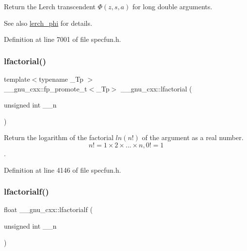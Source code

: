 Return the Lerch transcendent $ \Phi(z,s,a) $ for {\ttfamily  long double } arguments.

\begin{DoxySeeAlso}{See also}
\hyperlink{group__gnu__math__spec__func_ga31d7cfc601a99d72e58f654d0c890fd6}{lerch\+\_\+phi} for details. 
\end{DoxySeeAlso}


Definition at line 7001 of file specfun.\+h.

\mbox{\label{group__gnu__math__spec__func_gab256f8d7b77b9a8fefafca21827166eb}} 
\subsubsection{\texorpdfstring{lfactorial()}{lfactorial()}}
{\footnotesize\ttfamily template$<$typename \+\_\+\+Tp $>$ \\
\+\_\+\+\_\+gnu\+\_\+cxx\+::fp\+\_\+promote\+\_\+t$<$\+\_\+\+Tp$>$ \+\_\+\+\_\+gnu\+\_\+cxx\+::lfactorial (\begin{DoxyParamCaption}\item[{unsigned int}]{\+\_\+\+\_\+n }\end{DoxyParamCaption})\hspace{0.3cm}{\ttfamily [inline]}}



Return the logarithm of the factorial $ ln(n!) $ of the argument as a real number. \[ n! = 1 \times 2 \times ... \times n, 0! = 1 \]. 



Definition at line 4146 of file specfun.\+h.

\mbox{\label{group__gnu__math__spec__func_ga65af05c4093d4895a564a8d67e389a9b}} 
\subsubsection{\texorpdfstring{lfactorialf()}{lfactorialf()}}
{\footnotesize\ttfamily float \+\_\+\+\_\+gnu\+\_\+cxx\+::lfactorialf (\begin{DoxyParamCaption}\item[{unsigned int}]{\+\_\+\+\_\+n }\end{DoxyParamCaption})\hspace{0.3cm}{\ttfamily [inline]}}

